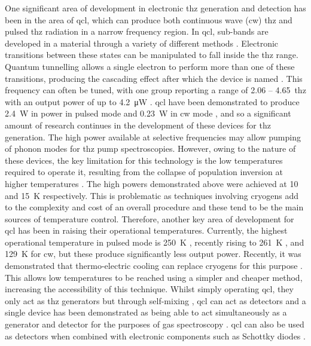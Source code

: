 One significant area of development in electronic \acrshort{thz} generation and detection has been in the area of \acrfull{qcl}, which can produce both continuous wave (\acrshort{cw}) \acrshort{thz} and pulsed \acrshort{thz} radiation in a narrow frequency region. In \acrshort{qcl}, sub\nobreakdash-bands are developed in a material through a variety of different methods \cite{Williams2007}. Electronic transitions between these states can be manipulated to fall inside the \acrshort{thz} range. Quantum tunnelling allows a single electron to perform more than one of these transitions, producing the cascading effect after which the device is named \cite{Faist1994}.
This frequency can often be tuned, with one group reporting a range of 2.06 – \SI{4.65}{\acrshort{thz}} with an output power of up to \SI{4.2}{\micro W} \cite{Lu2016}. 
\acrshort{qcl} have been demonstrated to produce \SI{2.4}{W} in power in pulsed mode \cite{Lin2017} and \SI{0.23}{W} in \acrshort{cw} mode \cite{Wang2016}, and so a significant amount of research continues in the development of these devices for \acrshort{thz} generation. The high power available at selective frequencies may allow pumping of phonon modes for \acrshort{thz} pump spectroscopies. 
However, owing to the nature of these devices, the key limitation for this technology is the low temperatures required to operate it, resulting from the collapse of population inversion at higher temperatures \cite{Williams2007}. The high powers demonstrated above were achieved at 10 and \SI{15}{K} respectively. This is problematic as techniques involving cryogens add to the complexity and cost of an overall procedure and these tend to be the main sources of temperature control. Therefore, another key area of development for \acrshort{qcl} has been in raising their operational temperatures. Currently, the highest operational temperature in pulsed mode is \SI{250}{K} \cite{Khalatpour2020}, recently rising to \SI{261}{K} \cite{Khalatpour2022}, and \SI{129}{K} \cite{Biermann2014} for \acrshort{cw}, but these produce significantly less output power.
Recently, it was demonstrated that thermo\nobreakdash-electric cooling can replace cryogens for this purpose \cite{Kainz2019}. This allows low temperatures to be reached using a simpler and cheaper method, increasing the accessibility of this technique.
Whilst simply operating \acrshort{qcl}, they only act as \acrshort{thz} generators but through self\nobreakdash-mixing \cite{Keeley2017}, \acrshort{qcl} can act as detectors and a single device has been demonstrated as being able to act simultaneously as a generator and detector for the purposes of gas spectroscopy \cite{Linfield2018}. \acrshort{qcl} can also be used as detectors when combined with electronic components such as Schottky diodes \cite{Wanke2010}.
